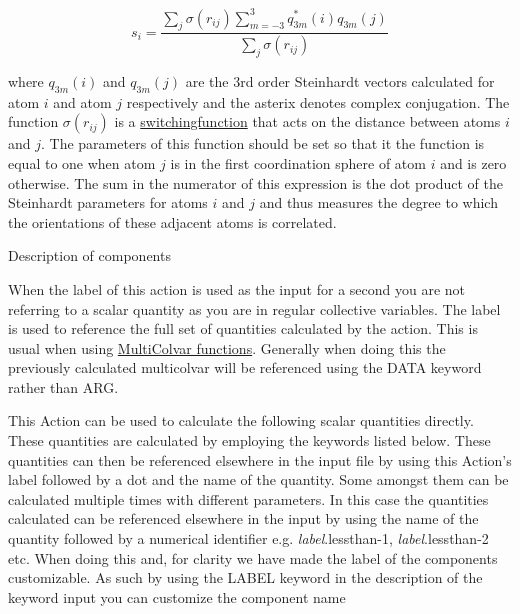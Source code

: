 \[ s_i = \frac{ \sum_j \sigma( r_{ij} ) \sum_{m=-3}^3 q_{3m}^{*}(i)q_{3m}(j) }{ \sum_j \sigma( r_{ij} ) } \]

where $q_{3m}(i)$ and $q_{3m}(j)$ are the 3rd order Steinhardt vectors calculated for atom $i$ and atom $j$ respectively and the asterix denotes complex conjugation. The function $\sigma( r_{ij} )$ is a \hyperlink{switchingfunction}{switchingfunction} that acts on the distance between atoms $i$ and $j$. The parameters of this function should be set so that it the function is equal to one when atom $j$ is in the first coordination sphere of atom $i$ and is zero otherwise. The sum in the numerator of this expression is the dot product of the Steinhardt parameters for atoms $i$ and $j$ and thus measures the degree to which the orientations of these adjacent atoms is correlated.

\begin{DoxyParagraph}{Description of components}

\end{DoxyParagraph}
When the label of this action is used as the input for a second you are not referring to a scalar quantity as you are in regular collective variables. The label is used to reference the full set of quantities calculated by the action. This is usual when using \hyperlink{mcolv_multicolvarfunction}{Multi\+Colvar functions}. Generally when doing this the previously calculated multicolvar will be referenced using the D\+A\+T\+A keyword rather than A\+R\+G.

This Action can be used to calculate the following scalar quantities directly. These quantities are calculated by employing the keywords listed below. These quantities can then be referenced elsewhere in the input file by using this Action's label followed by a dot and the name of the quantity. Some amongst them can be calculated multiple times with different parameters. In this case the quantities calculated can be referenced elsewhere in the input by using the name of the quantity followed by a numerical identifier e.\+g. {\itshape label}.lessthan-\/1, {\itshape label}.lessthan-\/2 etc. When doing this and, for clarity we have made the label of the components customizable. As such by using the L\+A\+B\+E\+L keyword in the description of the keyword input you can customize the component name

